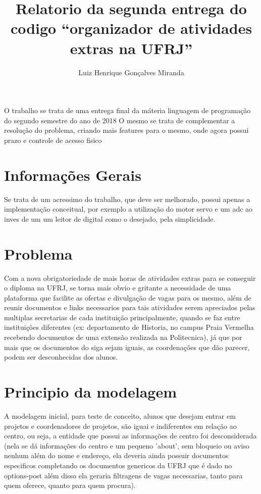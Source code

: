\documentclass[12pt]{article}
\title{Relatorio da segunda entrega do codigo ``organizador de atividades extras na UFRJ''}
\author{Luiz Henrique Gonçalves Miranda\inst{1} }
\begin{document}
 

\maketitle
     
\begin{resumo} 
  O trabalho se trata de uma entrega final da máteria linguagem de programação do segundo semestre do ano de 2018
  O mesmo se trata de complementar a resolução do problema, criando mais features para o mesmo, onde agora possui prazo
  e controle de acesso fisico
\end{resumo}


\section{Informações Gerais}

Se trata de um acressimo do trabalho, que deve ser melhorado, possui apenas a implementação conceitual, por exemplo
a utilização do motor servo e um adc ao inves de um um leitor de digital como o desejado, pela simplicidade.



\section{Problema}

Com a nova obrigatoriedade de mais horas de atividades extras para se conseguir o diploma na UFRJ, se torna mais obvio 
e gritante a necessidade de uma plataforma que facilite as ofertas e divulgação de vagas para os mesmo, além de reunir
documentos e links necessarios para tais atividades serem apreciados pelas multiplas secretarias de cada instituição
principalmente, quando se faz entre instituições diferentes (ex: departamento de Historia, no campus Praia Vermelha 
recebendo documentos de uma extensão realizada na Politecnica), já que por mais que os documentos do siga sejam iguais,
as coordenações que dão parecer, podem ser desconhecidas dos alunos.



\section{Principio da modelagem}
A modelagem inicial, para teste de conceito, alunos que desejam entrar em projetos e coordenadores de projetos, são iguai
e indiferentes em relação ao centro, ou seja, a entidade que possui as informações de centro foi desconsiderada (nela
se dá informações do centro e um pequeno 'about', sem bloqueio ou aviso nenhum além do nome e endereço, ela deveria 
ainda possuir documentos especificos completando os documentos genericos da UFRJ que é dado no 
options-post além disso ela geraria filtragens de vagas necessarias, tanto para quem oferece, quanto para quem procura).
\end{document}
